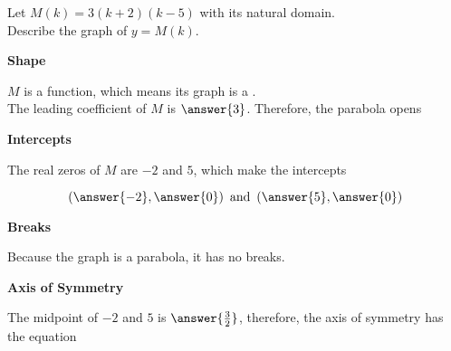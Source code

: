 \documentclass{ximera}
\author{Lee Wayand}
\begin{document}
\begin{exercise} 




Let $M(k) = 3(k+2)(k-5)$ with its natural domain. \\


Describe the graph of $y = M(k)$.






\begin{question}  \textbf{\textcolor{blue!55!black}{Shape}}


$M$ is a  function, which means its graph is a . \\

The leading coefficient of $M$ is $\answer{3}$. Therefore, the parabola opens 



\end{question}








\begin{question}  \textbf{\textcolor{blue!55!black}{Intercepts}}


The real zeros of $M$ are $-2$ and $5$, which make the intercepts

\[
\left( \answer{-2}, \answer{0}) \, \text{ and } \, (\answer{5}, \answer{0} \right)
\]

\end{question}







\begin{question}  \textbf{\textcolor{blue!55!black}{Breaks}}


Because the graph is a parabola, it has no breaks.

\end{question}







\begin{question}  \textbf{\textcolor{blue!55!black}{Axis of Symmetry}}


The midpoint of $-2$ and $5$ is $\answer{\frac{3}{2}}$, therefore, the axis of symmetry has the equation


\end{question}
\end{exercise}
\end{document}
